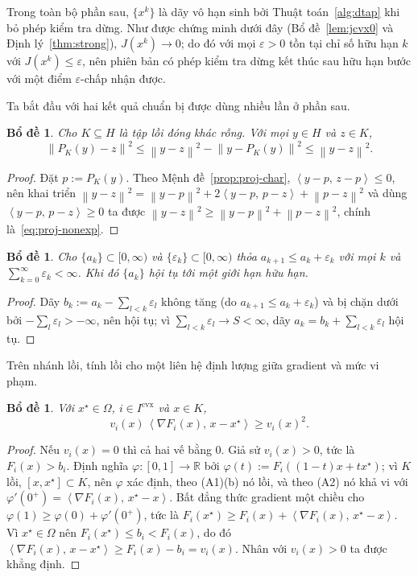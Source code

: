 \documentclass[]{interact}
\theoremstyle{plain}
\newtheorem{lemma}[theorem]{Bổ đề}
\theoremstyle{definition}
\theoremstyle{remark}
\newcommand{\R}{\mathbb{R}}
\newcommand{\norm}[1]{\left\lVert #1 \right\rVert}
\newcommand{\inner}[2]{\left\langle #1,\, #2 \right\rangle}
\newcommand{\cvx}{\mathrm{cvx}}
\begin{document}
Trong toàn bộ phần sau, $\{x^k\}$ là dãy vô hạn sinh bởi Thuật toán~\ref{alg:dtap} khi
bỏ phép kiểm tra dừng. Như được chứng minh dưới đây
(Bổ đề~\ref{lem:jcvx0} và Định lý~\ref{thm:strong}), $J(x^k)\to 0$; do đó với mọi
$\varepsilon>0$ tồn tại chỉ số hữu hạn $k$ với $J(x^k)\le\varepsilon$, nên phiên bản có phép kiểm tra dừng
kết thúc sau hữu hạn bước với một điểm $\varepsilon$-chấp nhận được.

Ta bắt đầu với hai kết quả chuẩn bị được dùng nhiều lần ở phần sau.

\begin{lemma}\label{lem:proj-nonexp}
Cho $K\subseteq H$ là tập lồi đóng khác rỗng. Với mọi $y\in H$ và $z\in K$,
\begin{equation}\label{eq:proj-nonexp}
\norm{P_K(y)-z}^2\le\norm{y-z}^2-\norm{y-P_K(y)}^2\le\norm{y-z}^2 .
\end{equation}
\end{lemma}
\begin{proof}
Đặt $p:=P_K(y)$. Theo Mệnh đề~\ref{prop:proj-char}, $\inner{y-p}{z-p}\le0$, nên khai triển
$\norm{y-z}^2=\norm{y-p}^2+2\inner{y-p}{p-z}+\norm{p-z}^2$ và dùng $\inner{y-p}{p-z}\ge0$
ta được $\norm{y-z}^2\ge\norm{y-p}^2+\norm{p-z}^2$, chính là~\eqref{eq:proj-nonexp}.
\end{proof}

\begin{lemma}\label{lem:seq}
Cho $\{a_k\}\subset[0,\infty)$ và $\{\varepsilon_k\}\subset[0,\infty)$ thỏa
$a_{k+1}\le a_k+\varepsilon_k$ với mọi $k$ và $\sum_{k=0}^\infty\varepsilon_k<\infty$.
Khi đó $\{a_k\}$ hội tụ tới một giới hạn hữu hạn.
\end{lemma}
\begin{proof}
Dãy $b_k:=a_k-\sum_{l<k}\varepsilon_l$ không tăng (do $a_{k+1}\le a_k+\varepsilon_k$) và
bị chặn dưới bởi $-\sum_l\varepsilon_l>-\infty$, nên hội tụ; vì
$\sum_{l<k}\varepsilon_l\to S<\infty$, dãy $a_k=b_k+\sum_{l<k}\varepsilon_l$ hội tụ.
\end{proof}

Trên nhánh lồi, tính lồi cho một liên hệ định lượng giữa gradient và
mức vi phạm.

\begin{lemma}\label{lem:grad-cvx}
Với $x^\star\in\Omega$, $i\in I^{\cvx}$ và $x\in K$,
\[
v_i(x)\,\inner{\nabla F_i(x)}{x-x^\star}\ge v_i(x)^2 .
\]
\end{lemma}
\begin{proof}
Nếu $v_i(x)=0$ thì cả hai vế bằng $0$. Giả sử $v_i(x)>0$, tức là $F_i(x)>b_i$. Định nghĩa
$\varphi:[0,1]\to\R$ bởi $\varphi(t):=F_i((1-t)x+tx^\star)$; vì $K$ lồi,
$[x,x^\star]\subset K$, nên $\varphi$ xác định, theo (A1)(b) nó lồi, và
theo (A2) nó khả vi với $\varphi'(0^+)=\inner{\nabla F_i(x)}{x^\star-x}$. Bất đẳng thức
gradient một chiều cho $\varphi(1)\ge\varphi(0)+\varphi'(0^+)$, tức là
$F_i(x^\star)\ge F_i(x)+\inner{\nabla F_i(x)}{x^\star-x}$. Vì $x^\star\in\Omega$ nên
$F_i(x^\star)\le b_i<F_i(x)$, do đó
$\inner{\nabla F_i(x)}{x-x^\star}\ge F_i(x)-b_i=v_i(x)$. Nhân với $v_i(x)>0$ ta được
khẳng định.
\end{proof}
\end{document}
